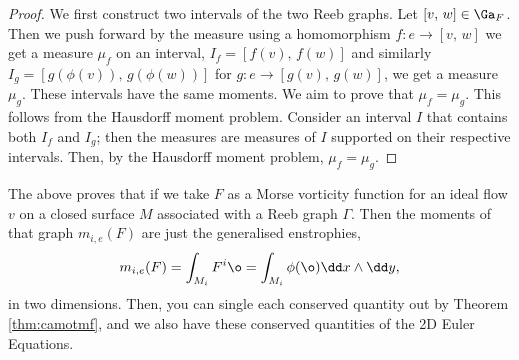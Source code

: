 \begin{proof}
  We first construct two intervals of the two Reeb graphs. Let $[v,\, w] \in \Ga_F$. Then we push forward by the measure using a homomorphism $f : e \to [v,\, w]$ we get a measure $\mu_f$ on an interval, $I_f = [f(v),\, f(w)]$ and similarly $I_g = [g(\phi(v)),\, g(\phi(w))]$ for $g : e \to [g(v),\, g(w)]$, we get a measure $\mu_g$. These intervals have the same moments. We aim to prove that $\mu_f = \mu_g$. This follows from the Hausdorff moment problem. Consider an interval $I$ that contains both $I_f$ and $I_g$; then the measures are measures of $I$ supported on their respective intervals. Then, by the Hausdorff moment problem, $\mu_f = \mu_g$.
\end{proof}
\noindent
The above proves that if we take $F$ as a Morse vorticity function for an ideal flow $v$ on a closed surface $M$ associated with a Reeb graph $\Gamma$. Then the moments of that graph $m_{i,e}(F)$ are just the generalised enstrophies,
$$ m_{i,e}(F) = \int_{M_i} F^i \o = \int_{M_i} \phi(\o) \dd x \wedge \dd y, $$
in two dimensions. Then, you can single each conserved quantity out by Theorem \ref{thm:camotmf}, and we also have these conserved quantities of the 2D Euler Equations.
